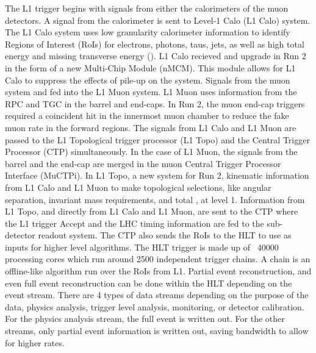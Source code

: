 \indent The L1 trigger begins with signals from either the calorimeters of the muon detectors. A signal from the calorimeter is sent to Level-1 Calo (L1 Calo) system. The L1 Calo system uses low granularity calorimeter information to identify Regions of Interest (RoIs) for electrons, photons, taus, jets, as well as high total energy and missing transverse energy (\met). L1 Calo recieved and upgrade in Run 2 in the form of a new Multi-Chip Module (nMCM). This module allows for L1 Calo to suppress the effects of pile-up on the system. \linebreak
\indent Signals from the muon system and fed into the L1 Muon system. L1 Muon uses information from the RPC and TGC in the barrel and end-caps. In Run 2, the muon end-cap triggers required a coincident hit in the innermost muon chamber to reduce the fake muon rate in the forward regions.\linebreak
\indent The signals from L1 Calo and L1 Muon are passed to the L1 Topological trigger processor (L1 Topo) and the Central Trigger Processor (CTP) simultaneously. In the case of L1 Muon, the signals from the barrel and the end-cap are merged in the muon Central Trigger Processor Interface  (MuCTPi). In L1 Topo, a new system for Run 2, kinematic information from L1 Calo and L1 Muon to make topological selections, like angular separation, invariant mass requirements, and total \met , at level 1.\linebreak
\indent Information from L1 Topo, and directly from L1 Calo and L1 Muon, are sent to the CTP where the L1 trigger Accept and the LHC timing information are fed to the sub-detector readout system. The CTP also sends the RoIs to the HLT to use as inputs for higher level algorithms.\linebreak
\indent The HLT trigger is made up of ~40000 processing cores which run around 2500 independent trigger chains. A chain is an offline-like algorithm run over the RoIs from L1. Partial event reconstruction, and even full event reconstruction can be done within the HLT depending on the event stream. There are 4 types of data streams depending on the purpose of the data, physics analysis, trigger level analysis, monitoring, or detector calibration. For the physics analysis stream, the full event is written out. For the other streams, only partial event information is written out, saving bandwidth to allow for higher rates.\linebreak
